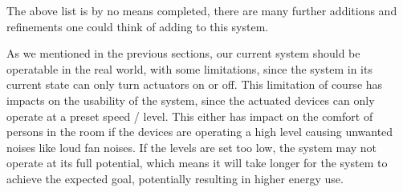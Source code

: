 The above list is by no means completed, there are many further additions and refinements one could think of adding to this system.

As we mentioned in the previous sections, our current system should be operatable in the real world, with some limitations, since the system in its current state can only turn actuators on or off.
This limitation of course has impacts on the usability of the system, since the actuated devices can only operate at a preset speed / level.
This either has impact on the comfort of persons in the room if the devices are operating a high level causing unwanted noises like loud fan noises.
If the levels are set too low, the system may not operate at its full potential, which means it will take longer for the system to achieve the expected goal, potentially resulting in higher energy use.

